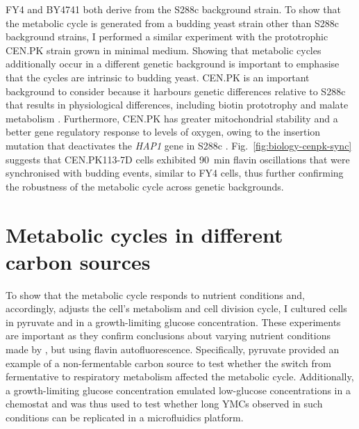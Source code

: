 FY4 and BY4741 both derive from the S288c background strain.
To show that the metabolic cycle is generated from a budding yeast strain other than S288c background strains, I performed a similar experiment with the prototrophic CEN.PK strain grown in minimal medium.
Showing that metabolic cycles additionally occur in a different genetic background is important to emphasise that the cycles are intrinsic to budding yeast.
CEN.PK is an important background to consider because it harbours genetic differences relative to S288c that results in physiological differences, including biotin prototrophy and malate metabolism \parencite{nijkampNovoSequencingAssembly2012}.
Furthermore, CEN.PK has greater mitochondrial stability and a better gene regulatory response to levels of oxygen, owing to the insertion mutation that deactivates the \textit{HAP1} gene in S288c \parencite{gaisneNaturalMutationSaccharomyces1999}.
Fig.\ \ref{fig:biology-cenpk-sync} suggests that CEN.PK113-7D cells exhibited \SI{90}{\minute} flavin oscillations that were synchronised with budding events, similar to FY4 cells, thus further confirming the robustness of the metabolic cycle across genetic backgrounds.


\section{Metabolic cycles in different carbon sources}
\label{sec:biology-carbon}

To show that the metabolic cycle responds to nutrient conditions and, accordingly, adjusts the cell's metabolism and cell division cycle, I cultured cells in pyruvate and in a growth-limiting glucose concentration.
These experiments are important as they confirm conclusions about varying nutrient conditions made by \textcite{papagiannakisAutonomousMetabolicOscillations2017},
but using flavin autofluorescence.
Specifically, pyruvate provided an example of a non-fermentable carbon source to test whether the switch from fermentative to respiratory metabolism affected the metabolic cycle.
Additionally, a growth-limiting glucose concentration emulated low-glucose concentrations in a chemostat and was thus used to test whether long YMCs observed in such conditions can be replicated in a microfluidics platform.

